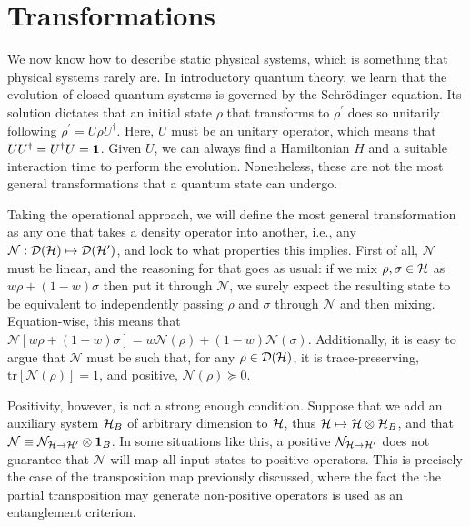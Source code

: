 	\section{Transformations}
	\label{sec:transformations}

		We now know how to describe static physical systems, which is something that physical systems rarely are. In introductory quantum theory, we learn that the evolution of closed quantum systems is governed by the Schrödinger equation. Its solution dictates that an initial state $\rho$ that transforms to $\rho^\prime$ does so unitarily following $\rho^\prime = U \rho U^\dagger$. Here, $U$ must be an unitary operator, which means that $UU^\dagger = U^\dagger U = \mathbf{1}$. Given $U$, we can always find a Hamiltonian $H$ and a suitable interaction time to perform the evolution. Nonetheless, these are not the most general transformations that a quantum state can undergo.
		
		Taking the operational approach, we will define the most general transformation as any one that takes a density operator into another, i.e., any $\mathcal{N} : \mathcal{D}(\mathcal{H}) \mapsto \mathcal{D}(\mathcal{H}^\prime)$, and look to what properties this implies. First of all, $\mathcal{N}$ must be linear, and the reasoning for that goes as usual: if we mix $\rho, \sigma \in \mathcal{H}$ as $w \rho + (1-w) \sigma$ then put it through $\mathcal{N}$, we surely expect the resulting state to be equivalent to independently passing $\rho$ and $\sigma$ through $\mathcal{N}$ and then mixing. Equation-wise, this means that $\mathcal{N} \left[ w \rho + (1-w) \sigma \right] = w \mathcal{N}(\rho) + (1-w) \mathcal{N}(\sigma)$. Additionally, it is easy to argue that $\mathcal{N}$ must be such that, for any $\rho \in \mathcal{D}(\mathcal{H})$, it is trace-preserving, $\text{tr}\left[ \mathcal{N}(\rho) \right] = 1$, and positive, $\mathcal{N}(\rho) \succeq 0$.
		
		Positivity, however, is not a strong enough condition. Suppose that we add an auxiliary system $\mathcal{H}_B$ of arbitrary dimension to $\mathcal{H}$, thus $\mathcal{H} \mapsto \mathcal{H} \otimes \mathcal{H}_B$, and that $\mathcal{N} \equiv \mathcal{N}_{\mathcal{H} \rightarrow \mathcal{H}^\prime} \otimes \mathbf{1}_B$. In some situations like this, a positive $\mathcal{N}_{\mathcal{H} \rightarrow \mathcal{H}^\prime}$ does not guarantee that $\mathcal{N}$ will map all input states to positive operators. This is precisely the case of the transposition map previously discussed, where the fact the the partial transposition may generate non-positive operators is used as an entanglement criterion. 
		

